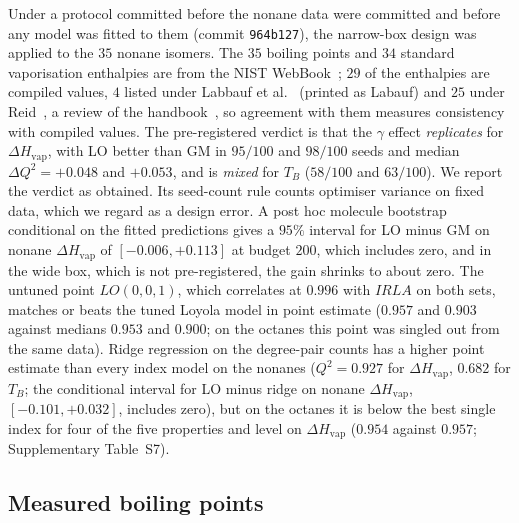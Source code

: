 \documentclass[a5paper, 10pt]{article}
\theoremstyle{plain}
\theoremstyle{remark}
\theoremstyle{definition}
\begin{document}
Under a protocol committed before the nonane data were committed and
before any model was fitted to them (commit \texttt{964b127}), the
narrow-box design was applied to the $35$ nonane isomers. The $35$ boiling
points and $34$ standard vaporisation enthalpies are from the NIST
WebBook~\cite{NISTWebBook}; $29$ of the enthalpies are compiled values,
$4$ listed under Labbauf et al.~\cite{LabaufGreenshieldsRossini1961} (printed as Labauf) and
$25$ under Reid~\cite{Reid1972}, a review of the
handbook~\cite{WilhoitZwolinski1971}, so agreement with them measures
consistency with compiled values. The pre-registered verdict is that the
$\gamma$ effect \emph{replicates} for $\Delta H_{\mathrm{vap}}$, with LO
better than GM in $95/100$ and $98/100$ seeds and median
$\Delta Q^2 = +0.048$ and $+0.053$, and is \emph{mixed} for $T_B$ ($58/100$
and $63/100$). We report the verdict as obtained. Its seed-count rule
counts optimiser variance on fixed data, which we regard as a design
error. A post hoc molecule bootstrap conditional on the fitted predictions gives a
$95\%$ interval for LO minus GM on nonane $\Delta H_{\mathrm{vap}}$ of
$[-0.006, +0.113]$ at budget $200$, which includes zero, and in the wide
box, which is not pre-registered, the gain shrinks to about zero. The
untuned point $LO(0,0,1)$, which correlates at $0.996$ with $IRLA$ on both
sets, matches or beats the tuned Loyola model in point estimate ($0.957$ and $0.903$ against
medians $0.953$ and $0.900$; on the octanes this point was singled out
from the same data). Ridge regression on the degree-pair counts has a
higher point estimate than every index model on the nonanes
($Q^2 = 0.927$ for $\Delta H_{\mathrm{vap}}$, $0.682$ for $T_B$; the conditional
interval for LO minus ridge on nonane $\Delta H_{\mathrm{vap}}$, $[-0.101, +0.032]$,
includes zero), but on the
octanes it is below the best single index for four of the five properties
and level on $\Delta H_{\mathrm{vap}}$ ($0.954$ against $0.957$; Supplementary
Table~S7).

\subsection{Measured boiling points}\label{sec:bp}
\end{document}
